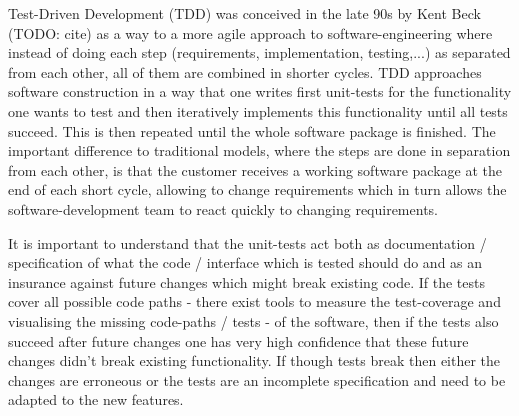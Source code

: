 Test-Driven Development (TDD) was conceived in the late 90s by Kent Beck (TODO: cite) as a way to a more agile approach to software-engineering where instead of doing each step (requirements, implementation, testing,...) as separated from each other, all of them are combined in shorter cycles. TDD approaches software construction in a way that one writes first unit-tests for the functionality one wants to test and then iteratively implements this functionality until all tests succeed. This is then repeated until the whole software package is finished. The important difference to traditional models, where the steps are done in separation from each other, is that the customer receives a working software package at the end of each short cycle, allowing to change requirements which in turn allows the software-development team to react quickly to changing requirements.

It is important to understand that the unit-tests act both as documentation / specification of what the code / interface which is tested should do and as an insurance against future changes which might break existing code. If the tests cover all possible code paths - there exist tools to measure the test-coverage and visualising the missing code-paths / tests - of the software, then if the tests also succeed after future changes one has very high confidence that these future changes didn't break existing functionality. If though tests break then either the changes are erroneous or the tests are an incomplete specification and need to be adapted to the new features.




